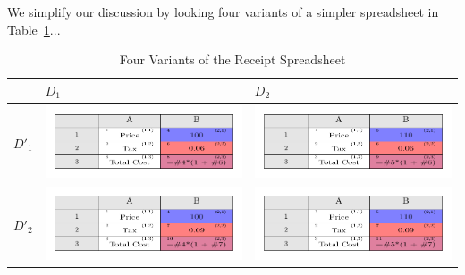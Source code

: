 \documentclass[conference]{IEEEtran}
\makeatletter
\def\fixedlabel#1#2{%
  \@bsphack%
  \protected@write\@auxout{}%
         {\string\newlabel{#1}{{#2}{\thepage}}}%
  \@esphack}
\newcommand{\figscale}{0.6}
\makeatother
\begin{document}
We simplify our discussion by looking four variants of a simpler spreadsheet in Table~\ref{tbl:costcalc}...


\begin{table}
\centering
  \begin{tabular}{|>{\centering\arraybackslash}m{2em}|>{\centering\arraybackslash}m{25em} >{\centering\arraybackslash}m{25em}|}
    \hline
    & $D_1$ & $D_2$ \\ \hline
    $D'_1$ & \includegraphics[scale=\figscale]{tikz/costs1}
      & \includegraphics[scale=\figscale]{tikz/costs2} \\
      $D'_2$ & \includegraphics[scale=\figscale]{tikz/costs3} %
      & \includegraphics[scale=\figscale]{tikz/costs4} \\ \hline
  \end{tabular}
  \caption{Four Variants of the Receipt Spreadsheet}\label{tbl:costcalc}
\end{table}
\end{document}
